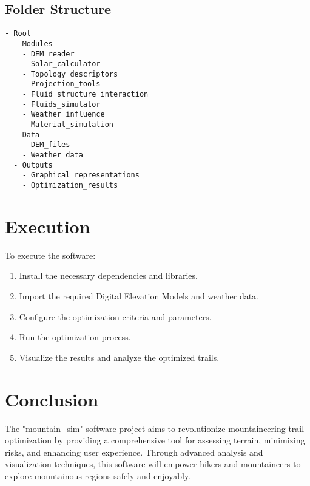 \documentclass{article}
\begin{document}
\subsection{Folder Structure}
\begin{verbatim}
- Root
  - Modules
    - DEM_reader
    - Solar_calculator
    - Topology_descriptors
    - Projection_tools
    - Fluid_structure_interaction
    - Fluids_simulator
    - Weather_influence
    - Material_simulation
  - Data
    - DEM_files
    - Weather_data
  - Outputs
    - Graphical_representations
    - Optimization_results
\end{verbatim}

\section{Execution}
To execute the software:
\begin{enumerate}
    \item Install the necessary dependencies and libraries.
    \item Import the required Digital Elevation Models and weather data.
    \item Configure the optimization criteria and parameters.
    \item Run the optimization process.
    \item Visualize the results and analyze the optimized trails.
\end{enumerate}

\section{Conclusion}
The "mountain\_sim" software project aims to revolutionize mountaineering trail optimization by providing a comprehensive tool for assessing terrain, minimizing risks, and enhancing user experience. Through advanced analysis and visualization techniques, this software will empower hikers and mountaineers to explore mountainous regions safely and enjoyably.
\end{document}
